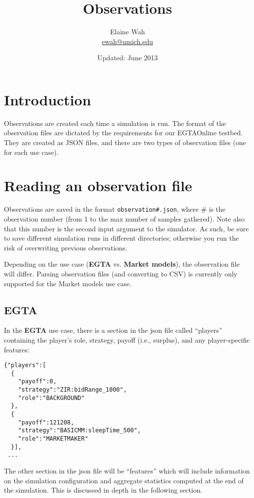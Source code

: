 \documentclass[11pt]{article}
\title{Observations}
\author{
  Elaine Wah\\
  \href{mailto:ewah@umich.edu}{ewah@umich.edu}
}
\date{Updated: June 2013}
\begin{document}
	
\maketitle

\section{Introduction}

Observations are created each time a simulation is run.
The format of the observation files are dictated by the requirements for our EGTAOnline testbed. They are created as JSON files, and there are two types of observation files (one for each use case).

\section{Reading an observation file}

Observations are saved in the format \verb|observation#.json|, where \# is the observation number (from 1 to the max number of samples gathered). Note also that this number is the second input argument to the simulator.
As such, be sure to save different simulation runs in different directories; otherwise you run the risk of overwriting previous observations.

Depending on the use case (\textbf{EGTA} vs. \textbf{Market models}), the observation file will differ. Parsing observation files (and converting to CSV) is currently only supported for the Market models use case.

\subsection{EGTA}

In the \textbf{EGTA} use case, there is a section in the json file called ``players'' containing the player's role, strategy, payoff (i.e., surplus), and any player-specific features:

\begin{verbatim}
{"players":[
  {
    "payoff":0,
    "strategy":"ZIR:bidRange_1000",
    "role":"BACKGROUND"
  },
  {
    "payoff":121208,
    "strategy":"BASICMM:sleepTime_500",
    "role":"MARKETMAKER"
  }],
 ...
\end{verbatim}

The other section in the json file will be ``features'' which will include information on the simulation configuration and aggregate statistics computed at the end of the simulation. This is discussed in depth in the following section.
\end{document}
